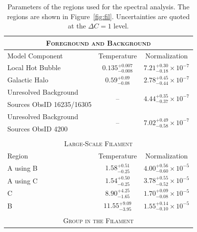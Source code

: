 \documentclass[11pt,a4paper,useAMS,iop]{emulateapj}
\begin{document}
\begin{table}
  \caption{Parameters of the regions used for the spectral analysis. The regions are shown in Figure~\ref{fig:fil}. Uncertainties are quoted at the $\Delta C = 1$ level. \label{tab:spectra}}
  \begin{center}
    \begin{threeparttable}
      \begin{tabular}{l c c}
              \multicolumn{3}{c}{\textsc{Foreground and Background}} \\
              \hline\hline
              Model Component & Temperature\tnote{a} & Normalization\tnote{b} \\
              \hline
              Local Hot Bubble & $0.135_{-0.008}^{+0.007}$ & $7.21_{-0.18}^{+0.30} \times 10^{-7}$ \\
              Galactic Halo & $0.59_{-0.08}^{+0.09}$ & $2.78_{-0.44}^{+0.45} \times 10^{-7}$ \\
              Unresolved Background       &\multirow{2}{*}{ -- } & \multirow{2}{*}{ $4.44_{-0.37}^{+0.35} \times 10^{-7}$} \\
              Sources ObsID 16235/16305 &                                    &            \\
              Unresolved Background       &\multirow{2}{*}{ -- } & \multirow{2}{*}{ $7.02_{-0.58}^{+0.49} \times 10^{-7}$} \\
              Sources ObsID 4200               &                                    &            \\
              \multicolumn{3}{c}{} \\
              \multicolumn{3}{c}{\textsc{Large-Scale Filament}} \\
              \hline\hline
                Region & Temperature\tnote{a} & Normalization\tnote{b} \\
              \hline
               A using B & $1.58_{-0.25}^{+0.51}$ & $4.00_{-0.60}^{+0.56} \times 10^{-5}$ \\
               A using C & $1.54_{-0.25}^{+0.50}$ & $3.78_{-0.52}^{+0.55} \times 10^{-5}$ \\
               C & $8.90_{-1.65}^{+4.25}$ & $1.70_{-0.08}^{+0.09} \times 10^{-5}$  \\
               B & $11.55_{-3.95}^{+9.09}$ & $1.55_{-0.10}^{+0.14} \times 10^{-5}$  \\
              \multicolumn{3}{c}{} \\
              \multicolumn{3}{c}{\textsc{Group in the Filament}} \\

\end{tabular}
\end{threeparttable}
\end{center}
\end{table}
\end{document}
